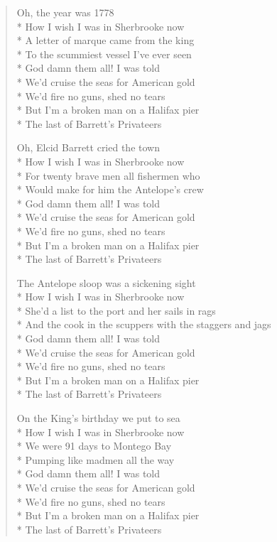 \documentclass[9pt,twoside]{extarticle}
\newenvironment{xverse}{
	\begin{verse}
	\fontsize{8.5}{10.5}\selectfont
	}
	{
	\end{verse}
	\penalty 0
}
\begin{document}
\begin{xverse}
Oh, the year was 1778 \\*
How I wish I was in Sherbrooke now \\*
A letter of marque came from the king \\*
To the scummiest vessel I’ve ever seen \\*
God damn them all! I was told \\*
We’d cruise the seas for American gold \\*
We’d fire no guns, shed no tears \\*
But I’m a broken man on a Halifax pier \\*
The last of Barrett’s Privateers

Oh, Elcid Barrett cried the town \\*
How I wish I was in Sherbrooke now \\*
For twenty brave men all fishermen who \\*
Would make for him the Antelope’s crew \\*
God damn them all! I was told \\*
We’d cruise the seas for American gold \\*
We’d fire no guns, shed no tears \\*
But I’m a broken man on a Halifax pier \\*
The last of Barrett’s Privateers

The Antelope sloop was a sickening sight \\*
How I wish I was in Sherbrooke now \\*
She’d a list to the port and her sails in rags \\*
And the cook in the scuppers with the staggers and jags \\*
God damn them all! I was told \\*
We’d cruise the seas for American gold \\*
We’d fire no guns, shed no tears \\*
But I’m a broken man on a Halifax pier \\*
The last of Barrett’s Privateers

On the King’s birthday we put to sea \\*
How I wish I was in Sherbrooke now \\*
We were 91 days to Montego Bay \\*
Pumping like madmen all the way \\*
God damn them all! I was told \\*
We’d cruise the seas for American gold \\*
We’d fire no guns, shed no tears \\*
But I’m a broken man on a Halifax pier \\*
The last of Barrett’s Privateers


\end{xverse}
\end{document}
